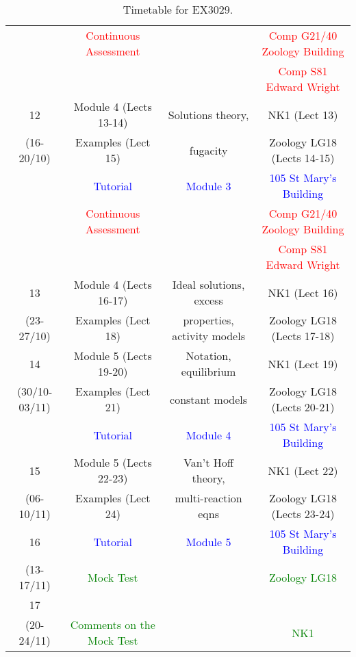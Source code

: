 \documentclass[12pts,a4paper,amsmath,amssymb,floatfix]{article}%
\newcommand{\red}{\textcolor{red}}
\newcommand{\blue}{\textcolor{blue}}
\newcommand{\green}{\textcolor{green}}
\begin{document}
\begin{table}
\begin{center}
\begin{tabular}{c | c c | c}
                        & \red{Continuous Assessment}&                     &    \red{Comp G21/40 Zoology Building} \\ 
                        &                          &                       &    \red{Comp S81 Edward Wright}      \\
      \hline       
             12         &   Module 4 (Lects 13-14) &Solutions theory,      &            NK1  (Lect 13)            \\ 
         (16-20/10)     &   Examples (Lect 15)     &fugacity               &            Zoology LG18 (Lects 14-15)\\
                        &   \blue{Tutorial}        &  \blue{Module 3}      &            \blue{105 St Mary's Building}\\
                        & \red{Continuous Assessment}&                     &    \red{Comp G21/40 Zoology Building} \\ 
                        &                          &                       &    \red{Comp S81 Edward Wright}      \\
      \hline       
             13         &   Module 4 (Lects 16-17) &Ideal solutions, excess&            NK1  (Lect 16)            \\ 
         (23-27/10)     &   Examples (Lect 18)     &properties, activity models&        Zoology LG18 (Lects 17-18)\\
      \hline       
             14         &   Module 5 (Lects 19-20) &Notation, equilibrium  &            NK1  (Lect 19)            \\ 
      (30/10-03/11)     &   Examples (Lect 21)     &constant models        &            Zoology LG18 (Lects 20-21)\\
                        &   \blue{Tutorial}        &  \blue{Module 4}      &            \blue{105 St Mary's Building}\\
      \hline       
             15         &   Module 5 (Lects 22-23) &Van't Hoff theory,     &            NK1  (Lect 22)            \\ 
         (06-10/11)     &   Examples (Lect 24)     &multi-reaction eqns    &            Zoology LG18 (Lects 23-24)\\
      \hline       
             16         &   \blue{Tutorial}        &  \blue{Module 5}      &            \blue{105 St Mary's Building}\\  
         (13-17/11)     &   \green{Mock Test}      &                       &            \green{Zoology LG18}      \\
      \hline       
             17         &                          &                       &                                      \\ 
         (20-24/11)     & \green{Comments on the Mock Test}&               &            \green{NK1}               \\
      \hline       
    \end{tabular}
  \end{center}
\caption{Timetable for EX3029.}
\label{table:timetable}
\end{table}
\end{document}
